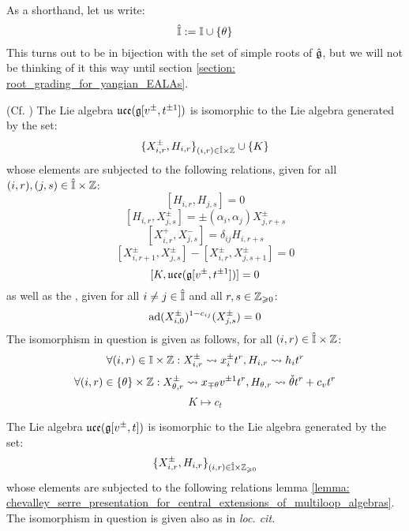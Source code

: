         \begin{convention}
            As a shorthand, let us write:
                $$\hat{\mathbb{I}} := \mathbb{I} \cup \{\theta\}$$
            This turns out to be in bijection with the set of simple roots of $\hat{\mathfrak{g}}$, but we will not be thinking of it this way until section \ref{section: root_grading_for_yangian_EALAs}.
        \end{convention}
        \begin{lemma} \label{lemma: chevalley_serre_presentation_for_central_extensions_of_multiloop_algebras}
            (Cf. \cite[Proposition 3.5]{moody_rao_yokonuma_vertex_representations_of_toroidal_lie_algebras}) The Lie algebra $\mathfrak{uce}(\mathfrak{g}[v^{\pm}, t^{\pm 1}])$ is isomorphic to the Lie algebra generated by the set:
                $$\{ X_{i, r}^{\pm}, H_{i, r} \}_{(i, r) \in \hat{\simpleroots} \x \Z} \cup \{ K \}$$
            whose elements are subjected to the following relations, given for all $(i, r), (j, s) \in \hat{\simpleroots} \x \Z$:
                $$[ H_{i, r}, H_{j, s} ] = 0$$
                $$[ H_{i, r}, X_{j, s}^{\pm} ] = \pm (\alpha_i, \alpha_j) X_{j, r + s}^{\pm}$$
                $$[ X_{i, r}^+, X_{j, s}^- ] = \delta_{ij} H_{i, r + s}$$
                $$[ X_{i, r + 1}^{\pm}, X_{j, s}^{\pm} ] - [ X_{i, r}^{\pm}, X_{j, s + 1}^{\pm} ] = 0$$
                $$[K, \mathfrak{uce}(\mathfrak{g}[v^{\pm}, t^{\pm 1}])] = 0$$
            as well as the , given for all $i \not = j \in \hat{\mathbb{I}}$ and all $r, s \in \mathbb{Z}_{\geqslant 0}$:
                $$\mathrm{ad}(X_{i, 0}^{\pm})^{1 - c_{ij}}( X_{j, s}^{\pm} ) = 0$$
            The isomorphism in question is given as follows, for all $(i, r) \in \hat{\simpleroots} \x \Z$:
                $$\forall (i, r) \in \simpleroots \x \Z: X_{i, r}^{\pm} \mapsto x_i^{\pm} t^r, H_{i, r} \mapsto h_i t^r$$
                $$\forall (i, r) \in \{\theta\} \x \Z: X_{\theta, r}^{\pm} \mapsto x_{\mp \theta} v^{\pm 1} t^r, H_{\theta, r} \mapsto \check{\theta} t^r + c_v t^r$$
                $$K \mapsto c_t$$
        \end{lemma}
        \begin{corollary}
            The Lie algebra $\mathfrak{uce}(\mathfrak{g}[v^{\pm}, t])$ is isomorphic to the Lie algebra generated by the set:
                $$\{ X_{i, r}^{\pm}, H_{i, r} \}_{(i, r) \in \hat{\simpleroots} \x \Z_{\geq 0}}$$
            whose elements are subjected to the following relations lemma \ref{lemma: chevalley_serre_presentation_for_central_extensions_of_multiloop_algebras}. The isomorphism in question is given also as in \textit{loc. cit.}
        \end{corollary}
